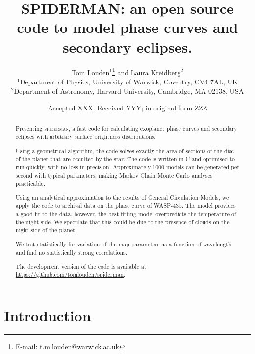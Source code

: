\documentclass[a4paper,fleqn,usenatbib]{mnras}
\title[SPIDERMAN]{SPIDERMAN: an open source code to model phase curves and secondary eclipses.}
\author[T. Louden, L. Kreidberg]{Tom Louden$^{1}$\thanks{E-mail: t.m.louden@warwick.ac.uk} and Laura Kreidberg$^{2}$\\
$^{1}$Department of Physics, University of Warwick, Coventry, CV4 7AL, UK\\
$^{2}$Department of Astronomy, Harvard University, Cambridge, MA 02138, USA}
\date{Accepted XXX. Received YYY; in original form ZZZ}
\begin{document}
\label{firstpage}
\pagerange{\pageref{firstpage}--\pageref{lastpage}}
\maketitle

\begin{abstract}

Presenting \textsc{spiderman}, a fast code for calculating exoplanet phase curves and secondary eclipses with arbitrary surface brightness distributions.

Using a geometrical algorithm, the code solves exactly the area of sections of the disc of the planet that are occulted by the star. The code is written in C and optimised to run quickly, with no loss in precision. Approximately 1000 models can be generated per second with typical parameters, making Markov Chain Monte Carlo analyses practicable. 

Using an analytical approximation to the results of General Circulation Models, we apply the code to archival data on the phase curve of WASP-43b. The model provides a good fit to the data, however, the best fitting model overpredicts the temperature of the night-side. We speculate that this could be due to the presence of clouds on the night side of the planet.

We test statistically for variation of the map parameters as a function of wavelength and find no statistically strong correlations.

The development version of the code is available at \url{https://github.com/tomlouden/spiderman}.

\end{abstract}

\begin{keywords}
\end{keywords}



\section{Introduction}\label{sec:introduction}
\end{document}
